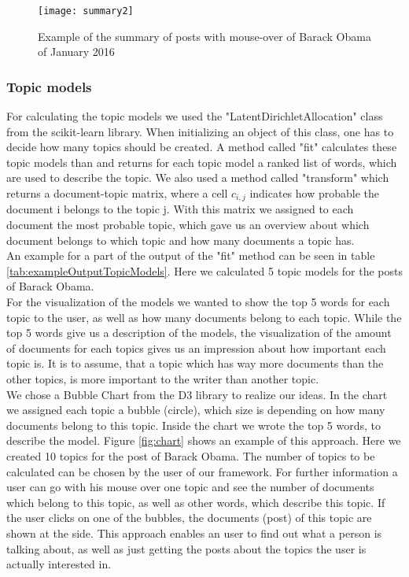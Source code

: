 \begin{figure}[t]
	\centering
	\texttt{[image: summary2]}
	\caption[ContributonOverTime]{Example of the summary of posts with mouse-over of Barack Obama of January 2016}
	\label{fig:summary2}
\end{figure}


\subsubsection{Topic models}
For calculating the topic models we used the "LatentDirichletAllocation" class from the scikit-learn library. When initializing an object of this class, one has to  decide how many topics should be created. A method called "fit" calculates these topic models than and returns for each topic model a ranked list of words, which are used to describe the topic. We also used a method called  "transform" which returns 
a document-topic matrix, where a cell $ c_{i,j} $ indicates how probable the document i belongs to the topic j. With this matrix we assigned to each document the most probable topic, which gave us an overview about which document belongs to which topic and  how many documents a topic has.  \\
An example for a part of the  output of the "fit" method can be seen in table \ref{tab:exampleOutputTopicModels}. Here we calculated 5 topic models for the posts of Barack Obama. \\
For the visualization of the models we wanted to show the top 5 words for each topic to the user, as well as how many documents belong to each topic. While the top 5 words give us a description of the models, the visualization of the amount of documents for each topics gives us an impression about how important each topic is. It is to assume, that a topic which has way more documents than the other topics, is more important to the writer than another  topic. \\
We chose a Bubble Chart from the D3 library to realize our ideas. In the chart we assigned each topic a bubble (circle), which size is depending on how many documents belong to this topic. Inside the chart we wrote the top 5 words, to describe the model. Figure \ref{fig:chart} shows an example of this approach. Here we created 10 topics for the post of Barack Obama. The number of topics to be calculated can be chosen by the user of our framework. For further information a user can go with his mouse over one topic and see the number of documents which belong to this topic, as well as other words, which describe this topic. If the user clicks on one of the bubbles, the documents (post) of this topic are shown at the side. This approach enables an user to find out what a person is talking about, as well as just getting the posts about the topics the user is actually interested in. 


